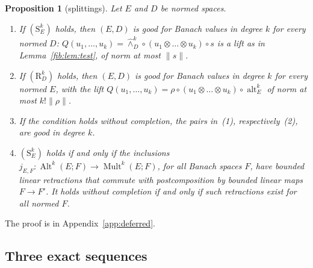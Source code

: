 \documentclass[11pt]{amsart}
\newtheorem{proposition}[theorem]{Proposition}
\theoremstyle{definition}
\theoremstyle{remark}
\numberwithin{equation}{section}
\newcommand{\Alt}{\operatorname{Alt}}
\newcommand{\Mult}{\operatorname{Mult}}
\newcommand{\norm}[1]{\lVert #1\rVert}
\theoremstyle{plain}
\theoremstyle{definition}
\theoremstyle{plain}
\begin{document}
\begin{proposition}[splittings]\label{fib:prop:split}
Let $E$ and $D$ be normed spaces.
\begin{enumerate}
\item If $(\mathrm S^k_E)$ holds, then $(E,D)$ is good for Banach values in degree $k$ for every normed $D$:
$Q(u_1,\dots,u_k)=\widehat\wedge^k_D\circ(u_1\otimes\dots\otimes u_k)\circ s$ is a lift as in
Lemma~\ref{fib:lem:test}, of norm at most $\norm s$.
\item If $(\mathrm R^k_D)$ holds, then $(E,D)$ is good for Banach values in degree $k$ for every normed $E$, with the
lift $Q(u_1,\dots,u_k)=\rho\circ(u_1\otimes\dots\otimes u_k)\circ\operatorname{alt}^k_E$ of norm at most $k!\norm\rho$.
\item If the condition holds without completion, the pairs in~(1), respectively~(2), are good in degree $k$.
\item $(\mathrm S^k_E)$ holds if and only if the inclusions $j_{E,F}\colon\Alt^k(E;F)\to\Mult^k(E;F)$, for all Banach
spaces $F$, have bounded linear retractions that commute with postcomposition by bounded linear maps $F\to F'$. It
holds without completion if and only if such retractions exist for all normed $F$.
\end{enumerate}
\end{proposition}

The proof is in Appendix~\ref{app:deferred}.

\subsection{Three exact sequences}\label{ob:ssec:sequences}
\end{document}
